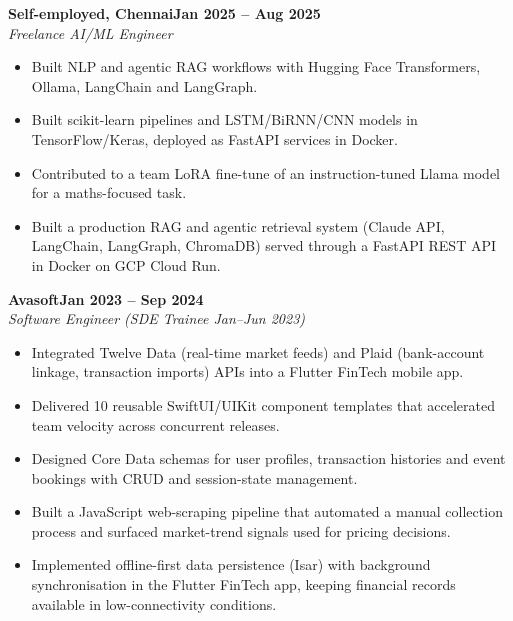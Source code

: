 \documentclass[a4paper,11pt]{article}
\newcommand{\entry}[4]{\needspace{4\baselineskip}\noindent\textbf{#1}\hfill\textbf{#2}\\ \textit{#3}\hfill\textit{#4}\par}
\begin{document}
\vspace{4pt}
\entry{Self-employed, Chennai}{Jan 2025 – Aug 2025}{Freelance AI/ML Engineer}{}
\begin{itemize}
  \item Built NLP and agentic RAG workflows with Hugging Face Transformers, Ollama, LangChain and LangGraph.
  \item Built scikit-learn pipelines and LSTM/BiRNN/CNN models in TensorFlow/Keras, deployed as FastAPI services in Docker.
  \item Contributed to a team LoRA fine-tune of an instruction-tuned Llama model for a maths-focused task.
  \item Built a production RAG and agentic retrieval system (Claude API, LangChain, LangGraph, ChromaDB) served through a FastAPI REST API in Docker on GCP Cloud Run.
\end{itemize}
\vspace{4pt}
\entry{Avasoft}{Jan 2023 – Sep 2024}{Software Engineer (SDE Trainee Jan–Jun 2023)}{}
\begin{itemize}
  \item Integrated Twelve Data (real-time market feeds) and Plaid (bank-account linkage, transaction imports) APIs into a Flutter FinTech mobile app.
  \item Delivered 10 reusable SwiftUI/UIKit component templates that accelerated team velocity across concurrent releases.
  \item Designed Core Data schemas for user profiles, transaction histories and event bookings with CRUD and session-state management.
  \item Built a JavaScript web-scraping pipeline that automated a manual collection process and surfaced market-trend signals used for pricing decisions.
  \item Implemented offline-first data persistence (Isar) with background synchronisation in the Flutter FinTech app, keeping financial records available in low-connectivity conditions.
\end{itemize}

\end{document}
